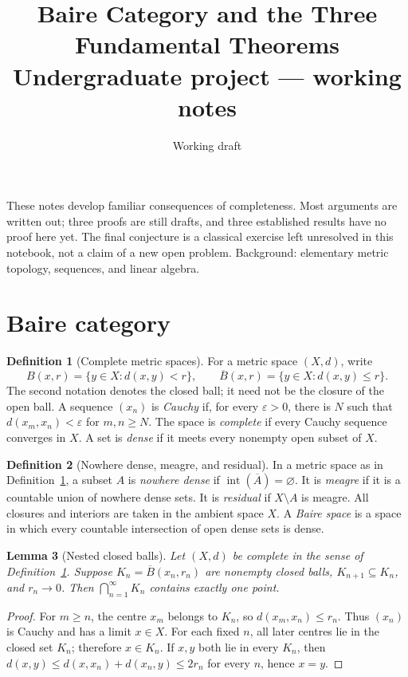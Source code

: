 \documentclass[11pt,a4paper]{article}
\title{Baire Category and the Three Fundamental Theorems\\[4pt]
  \large Undergraduate project --- working notes}
\author{}
\date{Working draft}
\theoremstyle{definition}
\newtheorem{definition}{Definition}[section]
\theoremstyle{plain}
\newtheorem{lemma}[definition]{Lemma}
\newcommand{\interior}{\operatorname{int}}
\begin{document}
\maketitle
\vspace{-1.3em}

These notes develop familiar consequences of completeness. Most arguments are
written out; three proofs are still drafts, and three established results have
no proof here yet. The final conjecture is a classical exercise left unresolved
in this notebook, not a claim of a new open problem. Background: elementary
metric topology, sequences, and linear algebra.

\section{Baire category}

\begin{definition}[Complete metric spaces]\label{def:complete}
For a metric space $(X,d)$, write
\[
 B(x,r)=\{y\in X:d(x,y)<r\},\qquad
 \overline B(x,r)=\{y\in X:d(x,y)\le r\}.
\]
The second notation denotes the closed ball; it need not be the closure of the
open ball. A sequence $(x_n)$ is \emph{Cauchy} if, for every $\varepsilon>0$,
there is $N$ such that $d(x_m,x_n)<\varepsilon$ for $m,n\ge N$.
The space is \emph{complete} if every Cauchy sequence converges in $X$.
A set is \emph{dense} if it meets every nonempty open subset of $X$.
\end{definition}

\begin{definition}[Nowhere dense, meagre, and residual]\label{def:category}
In a metric space as in Definition~\ref{def:complete}, a subset $A$ is
\emph{nowhere dense} if $\interior(\overline A)=\varnothing$.
It is \emph{meagre} if it is a countable union of nowhere dense sets.
It is \emph{residual} if $X\setminus A$ is meagre. All closures and interiors
are taken in the ambient space $X$. A \emph{Baire space} is a space in which
every countable intersection of open dense sets is dense.
\end{definition}

\begin{lemma}[Nested closed balls]\label{lem:nested-balls}
Let $(X,d)$ be complete in the sense of Definition~\ref{def:complete}.
Suppose $K_n=\overline B(x_n,r_n)$ are nonempty closed balls,
$K_{n+1}\subseteq K_n$, and $r_n\to0$. Then $\bigcap_{n=1}^{\infty}K_n$
contains exactly one point.
\end{lemma}
\begin{proof}
For $m\ge n$, the centre $x_m$ belongs to $K_n$, so
$d(x_m,x_n)\le r_n$. Thus $(x_n)$ is Cauchy and has a limit $x\in X$.
For each fixed $n$, all later centres lie in the closed set $K_n$;
therefore $x\in K_n$. If $x,y$ both lie in every $K_n$, then
$d(x,y)\le d(x,x_n)+d(x_n,y)\le2r_n$ for every $n$, hence $x=y$.
\end{proof}
\end{document}

